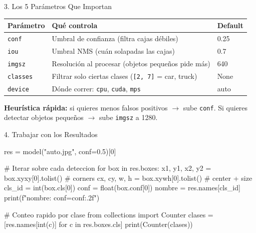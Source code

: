 \documentclass[aspectratio=169, 11pt]{beamer}
\begin{document}
\begin{frame}[shrink]{3. Los 5 Par\'ametros Que Importan}
  \vspace{6pt}
  {\footnotesize
  \begin{tabular}{@{}p{2.3cm} p{6.0cm} p{2.5cm}@{}}
    \toprule
    \textbf{Par\'ametro} & \textbf{Qu\'e controla} & \textbf{Default} \\
    \midrule
    \rowcolor{arcaGray}
    \texttt{conf}
    & Umbral de confianza (filtra cajas d\'ebiles)
    & 0.25 \\
    \texttt{iou}
    & Umbral NMS (cu\'an solapadas las cajas)
    & 0.7 \\
    \rowcolor{arcaGray}
    \texttt{imgsz}
    & Resoluci\'on al procesar (objetos peque\~nos pide m\'as)
    & 640 \\
    \texttt{classes}
    & Filtrar solo ciertas clases (\texttt{[2, 7]} = car, truck)
    & None \\
    \rowcolor{arcaGray}
    \texttt{device}
    & D\'onde correr: \texttt{cpu}, \texttt{cuda}, \texttt{mps}
    & auto \\
    \bottomrule
  \end{tabular}
  }

  \vspace{10pt}
  \begin{tcolorbox}[colback=arcaGray, colframe=arcaRed, boxrule=0.5pt,
    arc=2pt, left=6pt, right=6pt, top=4pt, bottom=4pt]
    {\scriptsize\color{arcaDark}
    \faKey\hspace{4pt}\textbf{Heur\'istica r\'apida:} si quieres menos
    falsos positivos $\to$ sube \texttt{conf}. Si quieres detectar
    objetos peque\~nos $\to$ sube \texttt{imgsz} a 1280.}
  \end{tcolorbox}
\end{frame}

\begin{frame}{4. Trabajar con los Resultados}
  \vspace{-4pt}
  \begin{pyblock}
res = model("auto.jpg", conf=0.5)[0]

# Iterar sobre cada deteccion
for box in res.boxes:
    x1, y1, x2, y2 = box.xyxy[0].tolist()    # corners
    cx, cy, w, h = box.xywh[0].tolist()      # center + size
    cls_id = int(box.cls[0])
    conf = float(box.conf[0])
    nombre = res.names[cls_id]
    print(f"{nombre}: conf={conf:.2f}")

# Conteo rapido por clase
from collections import Counter
clases = [res.names[int(c)] for c in res.boxes.cls]
print(Counter(clases))
  \end{pyblock}
\end{frame}
\end{document}
